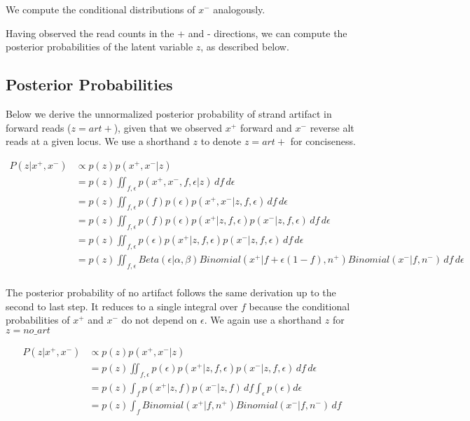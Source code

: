 \documentclass[a4paper]{article}
\begin{document}
We compute the conditional distributions of $x^-$  analogously.

Having observed the read counts in the + and - directions, we can compute the posterior probabilities of the latent variable $z$, as described below.

\subsection{Posterior Probabilities}

Below we derive the unnormalized posterior probability of strand artifact in forward reads ($z = art+$), given that we observed $x^+$ forward and $x^-$ reverse alt reads at a given locus. We use a shorthand $z$ to denote $z=art+$ for conciseness. 

\begin{equation}
\begin{split}
P(z |x^+, x^-) & \propto p(z) p(x^+, x^- | z) \\
& = p(z) \iint_{f, \epsilon}  p(x^+, x^-, f, \epsilon | z) \,df\,d\epsilon \\
& = p(z) \iint_{f, \epsilon}  p(f) p(\epsilon) p(x^+, x^- | z, f, \epsilon) \,df\,d\epsilon \\
& = p(z) \iint_{f, \epsilon}  p(f) p(\epsilon) p(x^+ | z, f, \epsilon) p(x^- | z, f, \epsilon) \,df\,d\epsilon \\
& = p(z) \iint_{f, \epsilon}  p(\epsilon) p(x^+ | z, f, \epsilon) p(x^- | z, f, \epsilon) \,df\,d\epsilon \\
& = p(z) \iint_{f, \epsilon}  Beta(\epsilon|\alpha, \beta) Binomial(x^+ | f + \epsilon(1-f), n^+) Binomial(x^- | f, n^-) \,df\,d\epsilon \\
\end{split}
\end{equation}

The posterior probability of no artifact follows the same derivation up to the second to last step. It reduces to a single integral over $f$ because the conditional probabilities of $x^+$ and $x^-$ do not depend on $\epsilon$. We again use a shorthand $z$ for $z=no\_art$

\begin{equation}
\begin{split}
P(z |x^+, x^-) & \propto p(z) p(x^+, x^- | z) \\
		    & = p(z) \iint_{f, \epsilon}  p(\epsilon) p(x^+ | z, f, \epsilon) p(x^- | z, f, \epsilon) \,df\,d\epsilon \\
		    & = p(z) \int_{f}  p(x^+ | z, f) p(x^- | z, f) \,df \int_{\epsilon}  p(\epsilon) d\epsilon \\
                     & = p(z) \int_{f}  Binomial(x^+ | f, n^+) Binomial(x^- | f, n^-) \,df \\
\end{split}
\end{equation}
\end{document}
